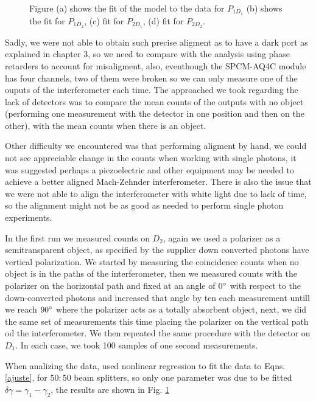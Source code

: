 \documentclass[12pt]{book}
\begin{document}
\begin{figure}[t!]
\begin{subfigure}[b]{0.45\linewidth}
\caption{}
\end{subfigure}
\caption{Figure (a) shows the fit of the model to the data for $P_{1D_{1}}$ (b) shows the fit for $P_{1D_{2}}$, (c) fit for $P_{2D_{1}}$, (d) fit for $P_{2D_{2}}$.}
\label{ajustes}
\end{figure}

Sadly, we were not able to obtain such precise aligment as to have a dark port as explained in chapter 3, so we need to compare with the analysis using phase retarders to account for misaligment, also, eventhough the SPCM-AQ4C module has four channels, two of them were broken so we  can only measure one of the ouputs of the interferometer each time. The approached we took regarding the lack of detectors was to compare the mean counts of the outputs with no object (performing one measurement with the detector in one position and then on the other), with the mean counts when there is an object.

Other difficulty we encountered was that performing aligment by hand, we could not see appreciable change in the counts when working with single photons, it was suggested perhaps a piezoelectric and other equipment may be needed to achieve a better aligned Mach-Zehnder interferometer. There is also the issue that we were not able to align the interferometer with white light due to lack of time, so the alignment might not be as good as needed to perform single photon experiments. 

In the first run we measured counts on $D_{2}$, again we used a polarizer as a semitransparent object, as specified by the supplier down converted photons have vertical polarization. We started  by measuring the coincidence counts when no object is in the paths of the interferometer, then we measured counts with the polarizer on the horizontal path and fixed at an angle of $0\degree$ with respect to the down-converted photons and increased that angle by ten each measurement untill we reach $90\degree$ where the polarizer acts as a totally absorbent object, next, we did the same set of measurements this time placing the polarizer on the vertical path od the interferometer. We then repeated the same procedure with the detector on $D_{1}$. In each case, we took 100 samples of one second measurements.

When analizing the data, used nonlinear regression to fit the data to Eqns. \ref{ajuste}, for $50:50$ beam splitters, so only one parameter was due to be fitted $\delta\gamma=\gamma_{1}-\gamma_{2}$, the results are shown in Fig. \ref{ajustes}
\end{document}
